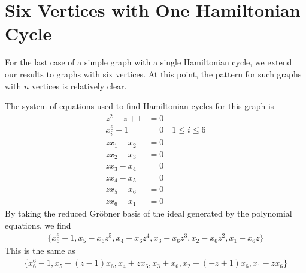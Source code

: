\documentclass[letterpaper]{article}
\newcommand{\aln}[1]{\begin{align*} #1 \end{align*}} %
\begin{document}
\section{Six Vertices with One Hamiltonian Cycle}
For the last case of a simple graph with a single Hamiltonian cycle, we extend our results to graphs with six vertices. At this point, the pattern for such graphs with $n$ vertices is relatively clear.
\begin{center}
\end{center}
The system of equations used to find Hamiltonian cycles for this graph is
\aln{
  z^2 - z + 1 &= 0\\
  x_i^6 - 1 &= 0 \quad 1 \leq i \leq 6\\
  z x_1 - x_2 &= 0\\
  z x_2 - x_3 &= 0\\
  z x_3 - x_4 &= 0\\
  z x_4 - x_5 &= 0\\
  z x_5 - x_6 &= 0\\
  z x_6 - x_1 &= 0
}
By taking the reduced Gr\"obner basis of the ideal generated by the polynomial equations, we find
\aln{
  \{x_6^6-1, x_5-x_6z^5, x_4-x_6z^4, x_3-x_6z^3, x_2-x_6z^2, x_1-x_6z\}
}
This is the same as
\aln{
  \{x_6^6-1, x_5+(z-1)x_6, x_4+zx_6, x_3+x_6, x_2+(-z+1)x_6, x_1-zx_6\}
}

\newpage
\end{document}
